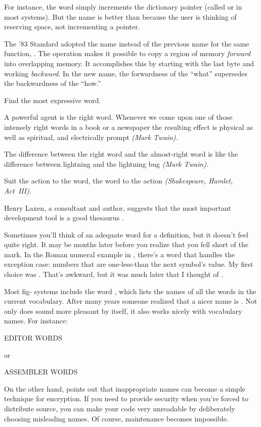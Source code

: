For instance, the \Forth{} word  simply increments the
dictionary pointer (called  or  in most systems).
But the name  is better than  because the
user is thinking of reserving space, not incrementing a pointer.

The '83 Standard adopted the name  instead of the
previous name for the same function, .  The operation
makes it possible to copy a region of memory \emph{forward} into
overlapping memory.  It accomplishes this by starting with the last
byte and working \emph{backward}.  In the new name, the forwardness of
the ``what'' supersedes the backwardness of the ``how.''

\begin{tip}
Find the most expressive word.
\end{tip}

\begin{tfquot}
A powerful agent is the right word.  Whenever we come upon one of
those intensely right words in a book or a newspaper the resulting
effect is physical as well as spiritual, and electrically prompt
\emph{(Mark Twain).}

The difference between the right word and the almost-right word is
like the difference between lightning and the lightning bug
\emph{(Mark Twain).}

Suit the action to the word, the word to the action
\emph{(Shakespeare, Hamlet, Act~III).}
\end{tfquot}
Henry Laxen,
a \Forth{} consultant and author, suggests that the most important
\Forth{} development tool is a good thesaurus \cite{laxen}.

Sometimes you'll think of an adequate word for a definition, but it
doesn't feel quite right.  It may be months later before you realize
that you fell short of the mark.  In the Roman numeral example in
, there's a word that handles the exception case: numbers that
are one-less-than the next symbol's value.  My first choice was
.  That's awkward, but it was much later that I thought
of .

Most fig-\Forth{} systems include the word , which lists
the names of all the words in the current vocabulary.  After many
years someone realized that a nicer name is .  Not only
does  sound more pleasant by itself, it also works nicely
with vocabulary names.  For instance:
\begin{Code}
EDITOR WORDS
\end{Code}
or
\begin{Code}
ASSEMBLER WORDS
\end{Code}
On the other hand,  points out
that inappropriate names can become a simple technique for encryption.
If you need to provide security when you're forced to distribute
source, you can make your code very unreadable by deliberately
choosing misleading names.  Of course, maintenance becomes impossible.

